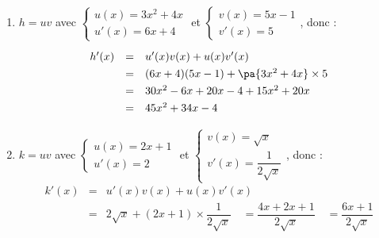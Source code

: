 \begin{ex}
\begin{correction}
\begin{enumerate}[label=\alph*)]
			\item $h = uv$ avec $\begin{cases}u(x) = 3x^2 + 4x\\u'(x) = 6x + 4\end{cases}$ et $\begin{cases}v(x) = 5x - 1\\v'(x) = 5\end{cases}$, donc :
			      \[
				      \def\arraystretch{1.3}
				      \begin{array}{rcl}
					      h'(x) & = & u'(x)v(x) + u(x)v'(x)                      \\
					            & = & (6x + 4)(5x - 1) + \pa{3x^2 + 4x} \times 5 \\
					            & = & 30x^2 - 6x + 20x - 4 + 15x^2 + 20x         \\
					            & = & 45x^2 + 34x - 4
				      \end{array}
			      \]

			\item $k = uv$ avec $\begin{cases}u(x) = 2x + 1\\u'(x) = 2\end{cases}$ et $\begin{cases}v(x) = \sqrt{x}\\v'(x) = \dfrac{1}{2\sqrt{x}}\end{cases}$, donc :
			      \[
				      \begin{array}{rcl}
					      k'(x) & = & u'(x)v(x) + u(x)v'(x)                                                                                                 \\
					            & = & 2\sqrt{x} + (2x + 1) \times \dfrac{1}{2\sqrt{x}} \quad=\dfrac{4x + 2x + 1}{2\sqrt{x}}\quad =\dfrac{6x + 1}{2\sqrt{x}}
				      \end{array}
			      \]

		\end{enumerate}
	\end{correction}
\end{ex}

